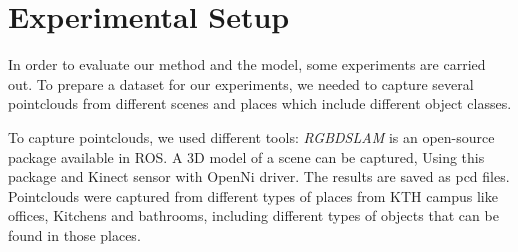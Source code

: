 % 
% 
%  
% 
% 
% 
% 
% 


\section{Experimental Setup}
\label{ExperimentalSetup.sec}
In order to evaluate our method and the model, some experiments are carried out.
To prepare a dataset for our experiments, we needed to capture several pointclouds from different scenes and places which 
include different object classes.


To capture pointclouds, we used different tools:
{\it RGBDSLAM} \cite{RGBDSLAM} is an open-source  package available in ROS. 
A 3D model of a scene can be captured, Using this package and Kinect sensor with OpenNi driver.  
The results are saved as pcd files.
Pointclouds were captured from different types of places from KTH campus like offices, Kitchens and bathrooms, including 
different types of objects that can be found in those places.

